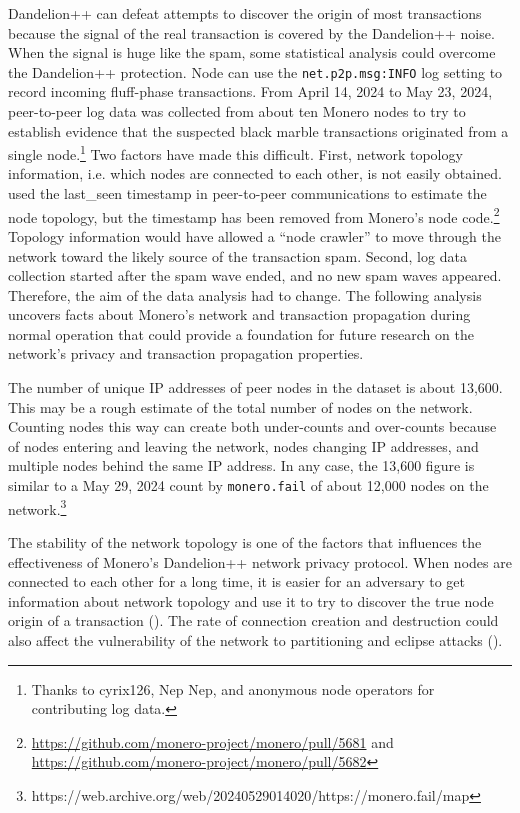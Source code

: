 \documentclass[usletter,11pt,english,openany]{article}
\begin{document}
Dandelion++ can defeat attempts to discover the origin of most transactions
because the signal of the real transaction is covered by the Dandelion++
noise. When the signal is huge like the spam, some statistical analysis
could overcome the Dandelion++ protection. Node can use the \texttt{net.p2p.msg:INFO}
log setting to record incoming fluff-phase transactions. From April
14, 2024 to May 23, 2024, peer-to-peer log data was collected from
about ten Monero nodes to try to establish evidence that the suspected
black marble transactions originated from a single node.\footnote{Thanks to cyrix126, Nep Nep, and anonymous node operators for contributing
log data.} Two factors have made this difficult. First, network topology information,
i.e. which nodes are connected to each other, is not easily obtained.
\cite{Cao2020} used the last\_seen timestamp in peer-to-peer communications
to estimate the node topology, but the timestamp has been removed
from Monero's node code.\footnote{\url{https://github.com/monero-project/monero/pull/5681} and \url{https://github.com/monero-project/monero/pull/5682}}
Topology information would have allowed a ``node crawler'' to move
through the network toward the likely source of the transaction spam.
Second, log data collection started after the spam wave ended, and
no new spam waves appeared. Therefore, the aim of the data analysis
had to change. The following analysis uncovers facts about Monero's
network and transaction propagation during normal operation that could
provide a foundation for future research on the network's privacy
and transaction propagation properties.

The number of unique IP addresses of peer nodes in the dataset is
about 13,600. This may be a rough estimate of the total number of
nodes on the network. Counting nodes this way can create both under-counts
and over-counts because of nodes entering and leaving the network,
nodes changing IP addresses, and multiple nodes behind the same IP
address. In any case, the 13,600 figure is similar to a May 29, 2024
count by \texttt{monero.fail} of about 12,000 nodes on the network.\footnote{https://web.archive.org/web/20240529014020/https://monero.fail/map}

The stability of the network topology is one of the factors that influences
the effectiveness of Monero's Dandelion++ network privacy protocol.
When nodes are connected to each other for a long time, it is easier
for an adversary to get information about network topology and use
it to try to discover the true node origin of a transaction (\cite{Sharma2022}).
The rate of connection creation and destruction could also affect
the vulnerability of the network to partitioning and eclipse attacks
(\cite{Franzoni2022b}).
\end{document}
